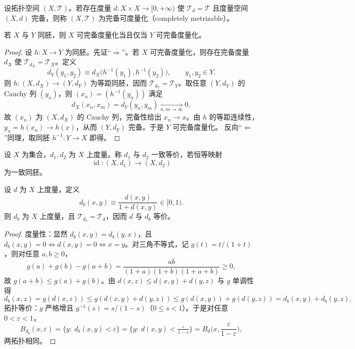 \documentclass[lang=cn,a4paper,newtx,figureplace=section,tableplace=section]{elegantbook}
\begin{document}
 \begin{definition}[完备可度量化空间]\label{def:completely-metrizable}
  设拓扑空间 $(X,\mathcal T)$。若存在度量 $d:X\times X\to[0,+\infty)$ 使 $\mathcal T_d=\mathcal T$ 且度量空间 $(X,d)$ 完备，则称 $(X,\mathcal T)$ 为完备可度量化（completely metrizable）。
 \end{definition}
  
\begin{proposition}[同胚不变性]\label{prop:metrizable-homeo-invariance}
  若 $X$ 与 $Y$ 同胚，则 $X$ 可完备度量化当且仅当 $Y$ 可完备度量化。
 \end{proposition}
 
 \begin{proof}
  设 $h:X\to Y$ 为同胚。先证“$\Rightarrow$”。若 $X$ 可完备度量化，则存在完备度量 $d_X$ 使 $\mathcal T_{d_X}=\mathcal T_X$。定义
  \[
   d_Y(y_1,y_2)\equiv d_X\big(h^{-1}(y_1),h^{-1}(y_2)\big),\qquad y_1,y_2\in Y.
  \]
  则 $h:(X,d_X)\to(Y,d_Y)$ 为等距同胚，因而 $\mathcal T_{d_Y}=\mathcal T_Y$。取任意 $(Y,d_Y)$ 的 Cauchy 列 $(y_n)$，则 $(x_n)=(h^{-1}(y_n))$ 满足
  \[
   d_X(x_n,x_m)=d_Y(y_n,y_m)\xrightarrow[n,m\to\infty]{}0,
  \]
  故 $(x_n)$ 为 $(X,d_X)$ 的 Cauchy 列，完备性给出 $x_n\to x$。由 $h$ 的等距连续性，$y_n=h(x_n)\to h(x)$，从而 $(Y,d_Y)$ 完备。于是 $Y$ 可完备度量化。
  反向“$\Leftarrow$”同理，取同胚 $h^{-1}:Y\to X$ 即得。
 \end{proof}
  
 \begin{definition}[等价度量]\label{def:equivalent-metrics}
  设 $X$ 为集合，$d_1,d_2$ 为 $X$ 上度量。称 $d_1$ 与 $d_2$ 一致等价，若恒等映射
  \[
   \operatorname{id}:(X,d_1)\longrightarrow (X,d_2)
  \]
  为一致同胚。
 \end{definition}
 
 \begin{proposition}[有界化度量与原度量等价]\label{prop:bounded-metric-equivalent}
  设 $d$ 为 $X$ 上度量，定义
  \[
   d_b(x,y)\equiv \frac{d(x,y)}{1+d(x,y)}\in[0,1).
  \]
  则 $d_b$ 为 $X$ 上度量，且 $\mathcal T_{d_b}=\mathcal T_d$，因而 $d$ 与 $d_b$ 等价。
 \end{proposition}
 \begin{proof}
  度量性：显然 $d_b(x,y)=d_b(y,x)$，且 $d_b(x,y)=0\iff d(x,y)=0\iff x=y$。对三角不等式，记 $g(t)=t/(1+t)$，则对任意 $a,b\ge0$，
  \[
   g(a)+g(b)-g(a+b)=\frac{ab}{(1+a)(1+b)(1+a+b)}\ge0,
  \]
  故 $g(a+b)\le g(a)+g(b)$。由 $d(x,z)\le d(x,y)+d(y,z)$ 与 $g$ 单调性得
  \[
   d_b(x,z)=g(d(x,z))\le g(d(x,y)+d(y,z))\le g(d(x,y))+g(d(y,z))=d_b(x,y)+d_b(y,z).
  \]
  拓扑等价：$g$ 严格增且 $g^{-1}(s)=s/(1-s)$（$0\le s<1$）。于是对任意 $0<\varepsilon<1$，
  \[
   B_{d_b}(x,\varepsilon)=\{y:\ d_b(x,y)<\varepsilon\}=\{y:\ d(x,y)<\tfrac{\varepsilon}{1-\varepsilon}\}=B_d\!\Big(x,\frac{\varepsilon}{1-\varepsilon}\Big),
  \]
  两拓扑相同。
\end{proof}
\end{document}
